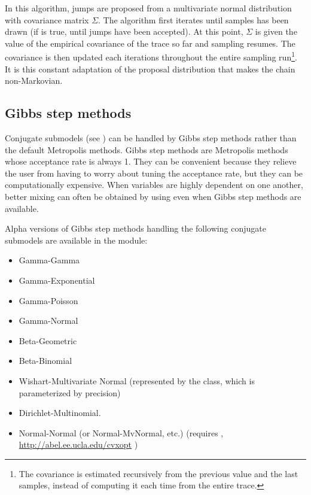 In this algorithm, jumps are proposed from a multivariate normal
distribution with covariance matrix $\Sigma$. The algorithm first iterates
until  samples has been drawn (if  is true, until
 jumps have been accepted). At this point, $\Sigma$ is given 
the value of the empirical covariance of the trace so far and sampling
resumes. The covariance is then updated each 
iterations throughout the entire sampling run\footnote{The covariance is
estimated recursively from the previous value and the last 
samples, instead of computing it each time from the entire trace.}. It is
this constant adaptation of the proposal distribution that makes the chain
non-Markovian. 


\hypertarget{gibbs}{}
\subsection*{Gibbs step methods} \label{gibbs}

Conjugate submodels (see \cite{gelman}) can be handled by Gibbs step methods rather than the default Metropolis methods. Gibbs step methods are Metropolis methods whose acceptance rate is always 1. They can be convenient because they relieve the user from having to worry about tuning the acceptance rate, but they can be computationally expensive. When variables are highly dependent on one another, better mixing can often be obtained by using  even when Gibbs step methods are available.

Alpha versions of Gibbs step methods handling the following conjugate submodels are available in the  module:
\begin{itemize}
    \item Gamma-Gamma
    \item Gamma-Exponential
    \item Gamma-Poisson
    \item Gamma-Normal
    \item Beta-Geometric
    \item Beta-Binomial
    \item Wishart-Multivariate Normal (represented by the  class, which is parameterized by precision)
    \item Dirichlet-Multinomial.
    \item Normal-Normal (or Normal-MvNormal, etc.) (requires , \href{http://abel.ee.ucla.edu/cvxopt}{http://abel.ee.ucla.edu/cvxopt} )
\end{itemize}

